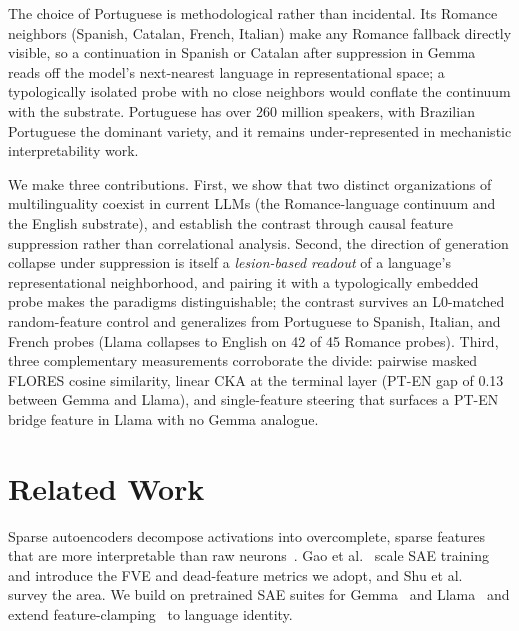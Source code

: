 \documentclass[runningheads]{llncs}
\begin{document}
The choice of Portuguese is methodological rather than incidental. Its Romance neighbors (Spanish, Catalan, French, Italian) make any Romance fallback directly visible, so a continuation in Spanish or Catalan after suppression in Gemma reads off the model's next-nearest language in representational space; a typologically isolated probe with no close neighbors would conflate the continuum with the substrate. Portuguese has over 260 million speakers, with Brazilian Portuguese the dominant variety, and it remains under-represented in mechanistic interpretability work.

We make three contributions. First, we show that two distinct organizations of multilinguality coexist in current LLMs (the Romance-language continuum and the English substrate), and establish the contrast through causal feature suppression rather than correlational analysis. Second, the direction of generation collapse under suppression is itself a \emph{lesion-based readout} of a language's representational neighborhood, and pairing it with a typologically embedded probe makes the paradigms distinguishable; the contrast survives an L0-matched random-feature control and generalizes from Portuguese to Spanish, Italian, and French probes (Llama collapses to English on 42 of 45 Romance probes). Third, three complementary measurements corroborate the divide: pairwise masked FLORES cosine similarity, linear CKA at the terminal layer (PT-EN gap of 0.13 between Gemma and Llama), and single-feature steering that surfaces a PT-EN bridge feature in Llama with no Gemma analogue.

\section{Related Work}
\label{sec:related}

Sparse autoencoders decompose activations into overcomplete, sparse features that are more interpretable than raw neurons~\cite{cunningham2023sparse,bricken2023monosemanticity}. Gao et al.~\cite{gao2024scaling} scale SAE training and introduce the FVE and dead-feature metrics we adopt, and Shu et al.~\cite{deng2025survey} survey the area. We build on pretrained SAE suites for Gemma~\cite{lieberum2024gemma} and Llama~\cite{he2024llama} and extend feature-clamping~\cite{bricken2023monosemanticity} to language identity.
\end{document}
